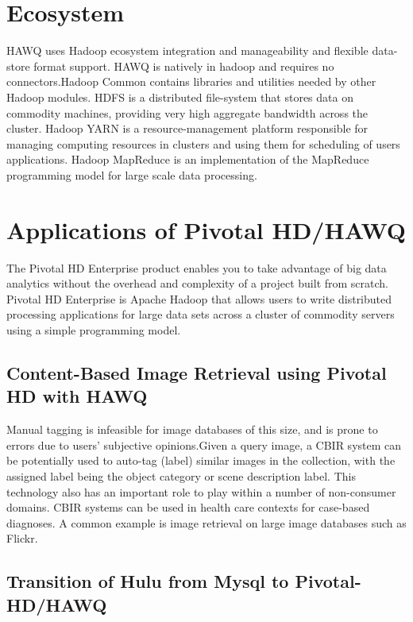 \documentclass[9pt,twocolumn,twoside]{../../styles/osajnl}
\begin{document}
\section{Ecosystem}

HAWQ uses {Hadoop ecosystem}\cite{www-about-hadoop} integration and
manageability and flexible data-store format support. HAWQ is
natively in hadoop and requires no connectors.Hadoop Common contains
libraries and utilities needed by other Hadoop modules. HDFS is a
distributed file-system that stores data on commodity machines,
providing very high aggregate bandwidth across the cluster. Hadoop
YARN is a resource-management platform responsible for managing
computing resources in clusters and using them for scheduling of
users applications. Hadoop MapReduce is an implementation of the
MapReduce programming model for large scale data processing.

\section{Applications of Pivotal HD/HAWQ}

The Pivotal HD Enterprise product enables you to take advantage of
big data analytics without the overhead and complexity of a project
built from scratch. Pivotal HD Enterprise is Apache Hadoop that
allows users to write distributed processing applications for large
data sets across a cluster of commodity servers using a simple
programming model.

\subsection{Content-Based Image Retrieval using Pivotal HD with HAWQ}

Manual tagging is infeasible for image databases of this size, and is
prone to errors due to users’ subjective opinions.Given a query
image, a {CBIR}\cite{www-cbir} system can be potentially used to
auto-tag (label)
similar images in the collection, with the assigned label being the
object category or scene description label. This technology also has
an important role to play within a number of non-consumer domains.
CBIR systems can be used in health care contexts for case-based
diagnoses. A common example is {image retrieval on large image
databases such as Flickr}\cite{www-paper-cbir}.

\subsection{Transition of Hulu from Mysql to Pivotal-HD/HAWQ}
\end{document}
